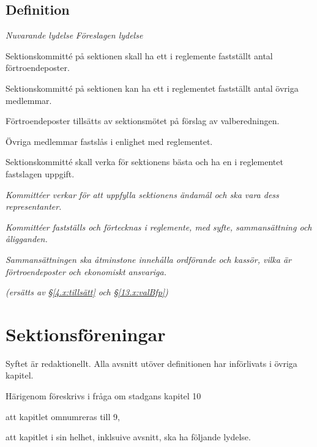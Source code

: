 \documentclass{article}
\newenvironment{lydelse}
    {\begin{paracol}{2}%
        \emph{Nuvarande lydelse}%
        \switchcolumn%
        \emph{Föreslagen lydelse}%
    \end{paracol}%
    \begin{enumerate}[label=\thesubsection.\arabic*]%
    \begin{paracol}{2}%
    }{\end{paracol}\end{enumerate}}
\begin{document}
\subsection{Definition}
\begin{lydelse}
\setcounter{section}{9}
\setcounter{subsection}{1}
  \item Sektionskommitté på sektionen skall ha ett i reglemente fastställt antal förtroendeposter.
  \item Sektionskommitté på sektionen kan ha ett i reglementet fastställt antal övriga medlemmar.
  \item Förtroendeposter tillsätts av sektionsmötet på förslag av valberedningen.
  \item Övriga medlemmar fastslås i enlighet med reglementet.
  \item Sektionskommitté skall verka för sektionens bästa och ha en i reglementet fastslagen uppgift.
\switchcolumn
  \setcounter{section}{8}
  \item \emph{Kommittéer verkar för att uppfylla sektionens ändamål och ska vara dess representanter.}
  \item \emph{Kommittéer fastställs och förtecknas i reglemente, med syfte, sammansättning och åligganden.}
  \item \emph{Sammansättningen ska åtminstone innehålla ordförande och kassör, vilka är förtroendeposter och ekonomiskt ansvariga.}
  \label{S:KomitteEkonomisktAnsvar}
  \item[] \emph{(ersätts av \S\ref{4.x:tillsätt} och \S\ref{13.x:valBfp})}
\end{lydelse}
\setcounter{section}{8}

\section{Sektionsföreningar}
Syftet är redaktionellt.
Alla avsnitt utöver definitionen har införlivats i övriga kapitel.

Härigenom föreskrivs i fråga om stadgans kapitel 10
\begin{dels}
\item att kapitlet omnumreras till 9,
\item att kapitlet i sin helhet, inklsuive avsnitt, ska ha följande lydelse.
\end{dels}
\end{document}

